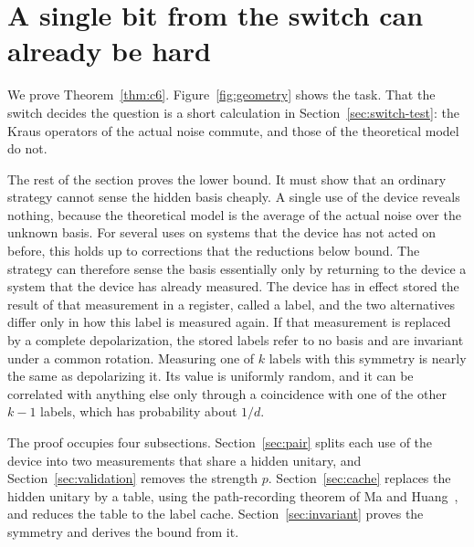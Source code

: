 \documentclass[11pt,letterpaper]{article}
\theoremstyle{definition}\newtheorem{definition}[theorem]{Definition}
\newcommand{\reffig}[1]{Figure~\ref{#1}}
\begin{document}
\section{A single bit from the switch can already be hard}\label{sec:c6-proof}


We prove Theorem~\ref{thm:c6}. \reffig{fig:geometry} shows the task.
That the switch decides the question is a short calculation in
Section~\ref{sec:switch-test}: the Kraus operators of the actual noise
commute, and those of the theoretical model do not.

The rest of the section proves the lower bound. It must show that an
ordinary strategy cannot sense the hidden basis cheaply. A single use
of the device reveals nothing, because the theoretical model is the
average of the actual noise over the unknown basis. For several uses
on systems that the device has not acted on before, this holds up to
corrections that the reductions below bound. The strategy can
therefore sense the basis essentially only by returning to the device
a system that the device has already measured. The device has in effect
stored the result of that measurement in a register, called a label,
and the two alternatives differ only in how this label is measured
again. If that measurement is replaced by a complete depolarization,
the stored labels refer to no basis and are invariant under a common
rotation. Measuring one of $k$ labels with this symmetry is nearly the
same as depolarizing it. Its value is uniformly random, and it can be
correlated with anything else only through a coincidence with one of
the other $k-1$ labels, which has probability about $1/d$.

The proof occupies four subsections. Section~\ref{sec:pair} splits each
use of the device into two measurements that share a hidden unitary,
and Section~\ref{sec:validation} removes the strength $p$.
Section~\ref{sec:cache} replaces the hidden unitary by a table, using
the path-recording theorem of Ma and Huang~\cite{mahuang2025}, and
reduces the table to the label cache.
Section~\ref{sec:invariant} proves the symmetry and derives the bound
from it.
\end{document}
